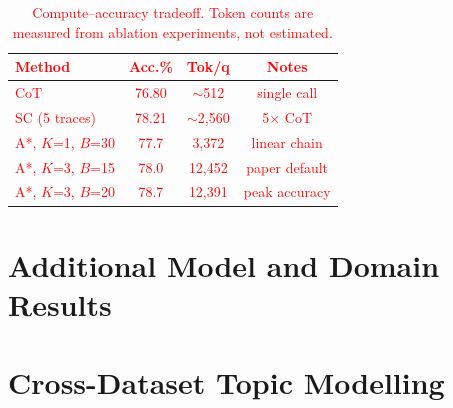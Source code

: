 \documentclass[11pt]{article}
\begin{document}
\begin{table}[h]
\centering
\small
\textcolor{red}{
\begin{tabular}{lccc}
\toprule
\textbf{Method} & \textbf{Acc.\%} & \textbf{Tok/q} & \textbf{Notes} \\
\midrule
CoT & 76.80 & $\sim$512 & single call \\
SC (5 traces) & 78.21 & $\sim$2,560 & 5$\times$ CoT \\
A*, $K$=1, $B$=30 & 77.7 & 3,372 & linear chain \\
A*, $K$=3, $B$=15 & 78.0 & 12,452 & paper default \\
A*, $K$=3, $B$=20 & 78.7 & 12,391 & peak accuracy \\
\bottomrule
\end{tabular}}
\caption{\textcolor{red}{Compute--accuracy tradeoff. Token counts are measured from ablation experiments, not estimated.}}
\label{tab:compute}
\end{table}

\section{Additional Model and Domain Results}
\label{app:additional_results}

\begin{table}[h]
\centering
\small
{}
\caption{\textcolor{red}{Additional results: 14B-scale on matched overlapping examples and math reasoning benchmarks. A* gains are topology-dependent across both scale and domain.}}
\label{tab:14b_results}
\label{tab:math_results}
\end{table}

\section{Cross-Dataset Topic Modelling}
\label{app:topics}
\end{document}
